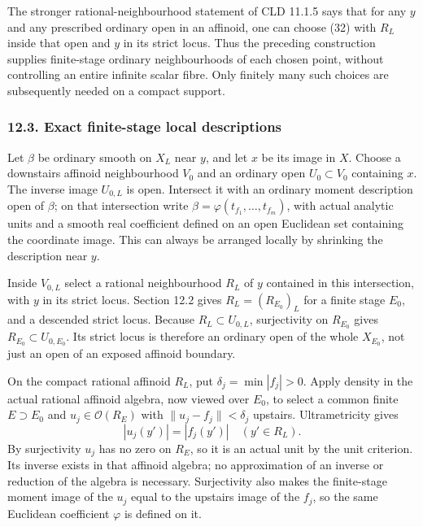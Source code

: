 \documentclass[
  11pt,
]{article}
\begin{document}
The stronger rational-neighbourhood statement of CLD 11.1.5 says that
for any \(y\) and any prescribed ordinary open in an affinoid, one can
choose (32) with \(R_L\) inside that open and \(y\) in its strict locus.
Thus the preceding construction supplies finite-stage ordinary
neighbourhoods of each chosen point, without controlling an entire
infinite scalar fibre. Only finitely many such choices are subsequently
needed on a compact support.

\subsubsection{12.3. Exact finite-stage local
descriptions}\label{exact-finite-stage-local-descriptions}

Let \(\beta\) be ordinary smooth on \(X_L\) near \(y\), and let \(x\) be
its image in \(X\). Choose a downstairs affinoid neighbourhood \(V_0\)
and an ordinary open \(U_0\subset V_0\) containing \(x\). The inverse
image \(U_{0,L}\) is open. Intersect it with an ordinary moment
description open of \(\beta\); on that intersection write
\(\beta=\varphi(t_{f_1},\ldots,t_{f_m})\), with actual analytic units
and a smooth real coefficient defined on an open Euclidean set
containing the coordinate image. This can always be arranged locally by
shrinking the description near \(y\).

Inside \(V_{0,L}\) select a rational neighbourhood \(R_L\) of \(y\)
contained in this intersection, with \(y\) in its strict locus. Section
12.2 gives \(R_L=(R_{E_0})_L\) for a finite stage \(E_0\), and a
descended strict locus. Because \(R_L\subset U_{0,L}\), surjectivity on
\(R_{E_0}\) gives \(R_{E_0}\subset U_{0,E_0}\). Its strict locus is
therefore an ordinary open of the whole \(X_{E_0}\), not just an open of
an exposed affinoid boundary.

On the compact rational affinoid \(R_L\), put \(\delta_j=\min|f_j|>0\).
Apply density in the actual rational affinoid algebra, now viewed over
\(E_0\), to select a common finite \(E\supset E_0\) and
\(u_j\in\mathcal O(R_E)\) with \(\|u_j-f_j\|<\delta_j\) upstairs.
Ultrametricity gives \[
                     |u_j(y')|=|f_j(y')|
                                 \quad(y'\in R_L).     \tag{35}
\] By surjectivity \(u_j\) has no zero on \(R_E\), so it is an actual
unit by the unit criterion. Its inverse exists in that affinoid algebra;
no approximation of an inverse or reduction of the algebra is necessary.
Surjectivity also makes the finite-stage moment image of the \(u_j\)
equal to the upstairs image of the \(f_j\), so the same Euclidean
coefficient \(\varphi\) is defined on it.
\end{document}
